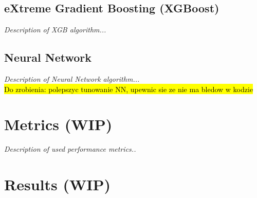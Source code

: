 \subsection{eXtreme Gradient Boosting (XGBoost)}
\textit{Description of XGB algorithm...}

\subsection{Neural Network}
\textit{Description of Neural Network algorithm...}
\\
\hl{Do zrobienia: polepszyc tunowanie NN, upewnic sie ze nie ma bledow w kodzie}


\section{Metrics (WIP)}
\textit{Description of used performance metrics..}


\section{Results (WIP)}

